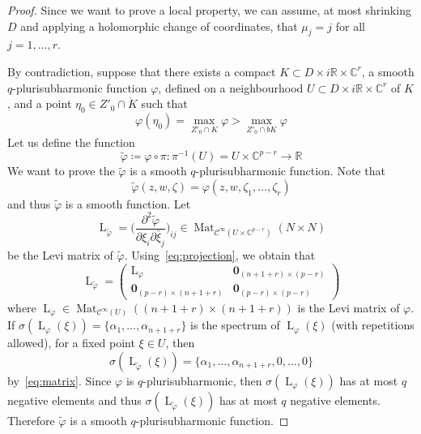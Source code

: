 \documentclass[reqno,oneside]{amsart}
\newcommand{\numberset}{\mathbb}
\newcommand{\R}{\numberset{R}}
\newcommand{\C}{\numberset{C}}
\renewcommand{\phi}{\varphi}
\DeclareMathOperator{\Mat}{Mat}
\renewcommand{\vec}{\boldsymbol}
\theoremstyle{definition}
\theoremstyle{plain}
\theoremstyle{remark}
\begin{document}
\begin{proof}
    Since we want to prove a local property, we can assume, at most shrinking $D$ and applying a holomorphic change of coordinates, that $\mu_j=j$ for all $j=1,\dots,r$.

    By contradiction, suppose that there exists a compact $K\subset D\times i\R\times\C^r$, a smooth $q$-plurisub\-harmonic function $\phi$, defined on a neighbourhood $U\subset D\times i\R\times\C^r$ of $K$, and a point $\eta_0\in Z'_0\cap\mathring{K}$ such that
    \begin{equation}
    \label{eq:contradiction}
        \phi(\eta_0)=\max_{Z'_0\cap K}\phi>\max_{Z'_0\cap bK}\phi
    \end{equation}
    Let us define the function
    \[
        \tilde\phi\coloneqq\phi\circ\pi:\pi^{-1}(U)=U\times\C^{p-r}\to\R
    \]
    We want to prove the $\tilde\phi$ is a smooth $q$-plurisubharmonic function. Note that
    \begin{equation}
    \label{eq:projection}
        \tilde\phi(z,w,\zeta)=\phi(z,w,\zeta_1,\dots,\zeta_r)
    \end{equation}
    and thus $\tilde\phi$ is a smooth function. Let
    \[
        \operatorname{L}_{\tilde\phi}=\biggl(\frac{\partial^2\tilde\phi}{\partial\xi_i \partial\bar{\xi}_j}\biggr)_{ij}\in\Mat_{\mathscr{C}^\infty(U\times\C^{p-r})}(N\times N)
    \]
    be the Levi matrix of $\tilde\phi$. Using~\eqref{eq:projection}, we obtain that
    \begin{equation}
    \label{eq:matrix}
        \operatorname{L}_{\tilde\phi}=
        \begin{pmatrix}
            \operatorname{L}_\phi & \vec{0}_{(n+1+r)\times(p-r)} \\
            \vec{0}_{(p-r)\times(n+1+r)} & \vec{0}_{(p-r)\times(p-r)}
        \end{pmatrix}
    \end{equation}
    where $\operatorname{L}_\phi\in\Mat_{\mathscr{C}^\infty(U)}((n+1+r)\times(n+1+r))$ is the Levi matrix of $\phi$. If $\sigma(\operatorname{L}_\phi(\xi))=\{\alpha_1,\dots,\alpha_{n+1+r}\}$ is the spectrum of $\operatorname{L}_\phi(\xi)$ (with repetitions allowed), for a fixed point $\xi\in U$, then
    \[
        \sigma(\operatorname{L}_{\tilde\phi}(\xi))=\{\alpha_1,\dots,\alpha_{n+1+r},0,\dots,0\}
    \]
    by~\eqref{eq:matrix}. Since $\phi$ is $q$-plurisubharmonic, then $\sigma(\operatorname{L}_\phi(\xi))$ has at most $q$ negative elements and thus $\sigma(\operatorname{L}_{\tilde\phi}(\xi))$ has at most $q$ negative elements. Therefore $\tilde\phi$ is a smooth $q$-plurisubharmonic function.


\end{proof}
\end{document}
